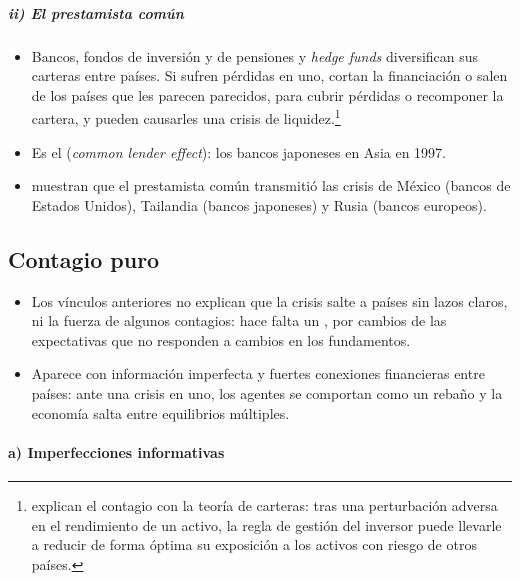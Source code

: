 \documentclass[11pt]{article}
\begin{document}
\subparagraph{ii) El prestamista común}

\begin{itemize}
\item Bancos, fondos de inversión y de pensiones y \emph{hedge funds} diversifican sus carteras entre países. Si sufren pérdidas en uno, cortan la financiación o salen de los países que les parecen parecidos, para cubrir pérdidas o recomponer la cartera, y pueden causarles una crisis de liquidez.\footnote{\textcite{SchinasiSmith2001} explican el contagio con la teoría de carteras: tras una perturbación adversa en el rendimiento de un activo, la regla de gestión del inversor puede llevarle a reducir de forma óptima su exposición a los activos con riesgo de otros países.}
\item Es el  (\emph{common lender effect})\nocite{KaminskyReinhart2000Contagion}: los bancos japoneses en Asia en 1997.
\item \textcite{VanRijckeghemWeder2001} muestran que el prestamista común transmitió las crisis de México (bancos de Estados Unidos), Tailandia (bancos japoneses) y Rusia (bancos europeos).
\end{itemize}

\subsection{Contagio puro}\label{sec:contagio-puro}

\begin{itemize}
\item Los vínculos anteriores no explican que la crisis salte a países sin lazos claros, ni la fuerza de algunos contagios: hace falta un , por cambios de las expectativas que no responden a cambios en los fundamentos.
\item Aparece con información imperfecta y fuertes conexiones financieras entre países: ante una crisis en uno, los agentes se comportan como un rebaño y la economía salta entre equilibrios múltiples.
\end{itemize}

\paragraph{a) Imperfecciones informativas}
\end{document}
